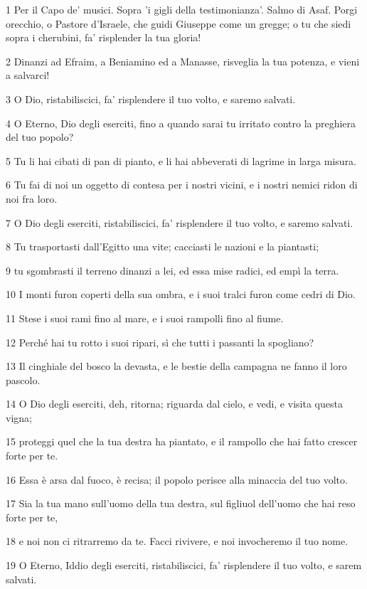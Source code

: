 \par 1 Per il Capo de' musici. Sopra 'i gigli della testimonianza'. Salmo di Asaf. Porgi orecchio, o Pastore d'Israele, che guidi Giuseppe come un gregge; o tu che siedi sopra i cherubini, fa' risplender la tua gloria!
\par 2 Dinanzi ad Efraim, a Beniamino ed a Manasse, risveglia la tua potenza, e vieni a salvarci!
\par 3 O Dio, ristabiliscici, fa' risplendere il tuo volto, e saremo salvati.
\par 4 O Eterno, Dio degli eserciti, fino a quando sarai tu irritato contro la preghiera del tuo popolo?
\par 5 Tu li hai cibati di pan di pianto, e li hai abbeverati di lagrime in larga misura.
\par 6 Tu fai di noi un oggetto di contesa per i nostri vicini, e i nostri nemici ridon di noi fra loro.
\par 7 O Dio degli eserciti, ristabiliscici, fa' risplendere il tuo volto, e saremo salvati.
\par 8 Tu trasportasti dall'Egitto una vite; cacciasti le nazioni e la piantasti;
\par 9 tu sgombrasti il terreno dinanzi a lei, ed essa mise radici, ed empì la terra.
\par 10 I monti furon coperti della sua ombra, e i suoi tralci furon come cedri di Dio.
\par 11 Stese i suoi rami fino al mare, e i suoi rampolli fino al fiume.
\par 12 Perché hai tu rotto i suoi ripari, sì che tutti i passanti la spogliano?
\par 13 Il cinghiale del bosco la devasta, e le bestie della campagna ne fanno il loro pascolo.
\par 14 O Dio degli eserciti, deh, ritorna; riguarda dal cielo, e vedi, e visita questa vigna;
\par 15 proteggi quel che la tua destra ha piantato, e il rampollo che hai fatto crescer forte per te.
\par 16 Essa è arsa dal fuoco, è recisa; il popolo perisce alla minaccia del tuo volto.
\par 17 Sia la tua mano sull'uomo della tua destra, sul figliuol dell'uomo che hai reso forte per te,
\par 18 e noi non ci ritrarremo da te. Facci rivivere, e noi invocheremo il tuo nome.
\par 19 O Eterno, Iddio degli eserciti, ristabiliscici, fa' risplendere il tuo volto, e sarem salvati.

